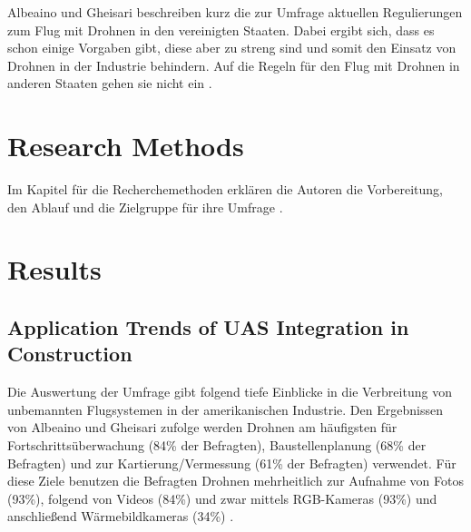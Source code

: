 Albeaino und Gheisari beschreiben kurz die zur Umfrage aktuellen Regulierungen zum Flug mit Drohnen in den vereinigten Staaten.
Dabei ergibt sich, dass es schon einige Vorgaben gibt, diese aber zu streng sind und somit den Einsatz von Drohnen in der Industrie behindern.
Auf die Regeln für den Flug mit Drohnen in anderen Staaten gehen sie nicht ein \cite[S. 92]{abaeano2021trends}.

\section{Research Methods}
Im Kapitel für die Recherchemethoden erklären die Autoren die Vorbereitung, den Ablauf und die Zielgruppe für ihre Umfrage \cite[S. 93]{abaeano2021trends}.

\section{Results}
\subsection{Application Trends of UAS Integration in Construction}


Die Auswertung der Umfrage gibt folgend tiefe Einblicke in die Verbreitung von unbemannten Flugsystemen in der amerikanischen Industrie.
Den Ergebnissen von Albeaino und Gheisari zufolge werden Drohnen am häufigsten für Fortschrittsüberwachung (84\% der Befragten), Baustellenplanung (68\% der Befragten) und zur Kartierung/Vermessung (61\% der Befragten) verwendet.
Für diese Ziele benutzen die Befragten Drohnen mehrheitlich zur Aufnahme von Fotos (93\%), folgend von Videos (84\%) und zwar mittels RGB-Kameras (93\%) und anschließend Wärmebildkameras (34\%) \cite[S. 95--97]{abaeano2021trends}.

